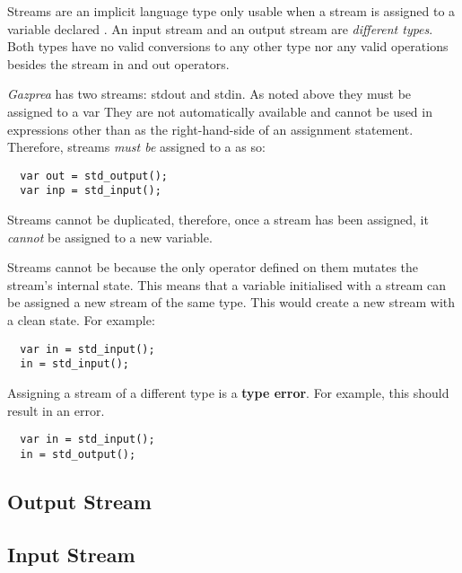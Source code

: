 \documentclass[../../gazprea.tex]{subfiles}
\begin{document}
Streams are an implicit language type only usable when a stream is assigned to a variable declared
. An input stream and an output stream are \textit{different types}. Both types have no
valid conversions to any other type nor any valid operations besides the stream in and out
operators.

\textit{Gazprea} has two streams: stdout and stdin. As noted above they must be assigned to a var
They are not automatically available and cannot be used in expressions other than as the
right-hand-side of an assignment statement. Therefore, streams \textit{must be} assigned to a
 as so:
\begin{lstlisting}
  var out = std_output();
  var inp = std_input();
\end{lstlisting}

Streams cannot be duplicated, therefore, once a stream has been assigned, it \textit{cannot} be
assigned to a new variable.

Streams cannot be  because the only operator defined on them mutates the stream's
internal state. This means that a variable initialised with a stream can be assigned a new stream of
the same type. This would create a new stream with a clean state. For example:
\begin{lstlisting}
  var in = std_input();
  in = std_input();
\end{lstlisting}

Assigning a stream of a different type is a \textbf{type error}. For example, this should result in
an error.
\begin{lstlisting}
  var in = std_input();
  in = std_output();
\end{lstlisting}

\subsection{Output Stream}
\label{ssec:output}


\subsection{Input Stream}
\label{ssec:input}

\end{document}
